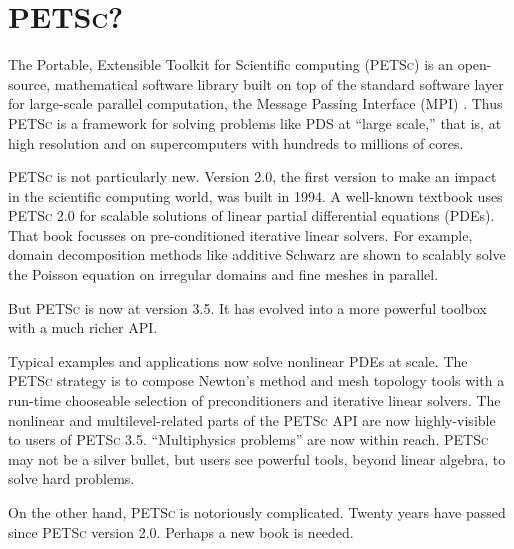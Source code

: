 \documentclass{tufte-book}
\theoremstyle{definition}
\newcommand{\PETSc}{\textsc{PETSc}\xspace}
\begin{document}
\section{\PETSc?}

The Portable, Extensible Toolkit for Scientific computing (\PETSc{}) \citep{petsc-user-ref} is an open-source, mathematical software library built on top of the standard software layer for large-scale parallel computation, the Message Passing Interface (MPI) \citep{Groppetal1999}.  Thus \PETSc is a framework for solving problems like PDS at ``large scale,'' that is, at high resolution and on supercomputers with hundreds to millions of cores.

\PETSc is not particularly new.  Version 2.0, the first version to make an impact in the scientific computing world, was built in 1994.  A well-known textbook \citet{Smithetal1996} uses \PETSc 2.0 for scalable solutions of linear partial differential equations (PDEs).  That book focusses on pre-conditioned iterative linear solvers.  For example, domain decomposition methods like additive Schwarz are shown to scalably solve the Poisson equation on irregular domains and fine meshes in parallel.

But \PETSc is now at version 3.5.  It has evolved into a more powerful toolbox with a much richer API.

Typical examples and applications now solve nonlinear PDEs at scale.  The \PETSc strategy is to compose Newton's method and mesh topology tools with a run-time chooseable selection of preconditioners and iterative linear solvers.  The nonlinear and multilevel-related parts of the \PETSc API are now highly-visible to users of \PETSc 3.5.  ``Multiphysics problems'' are now within reach.  \PETSc may not be a silver bullet, but users see powerful tools, beyond linear algebra, to solve hard problems.

On the other hand, \PETSc is notoriously complicated.  Twenty years have passed since \PETSc version 2.0.  Perhaps a new book is needed.
\end{document}
